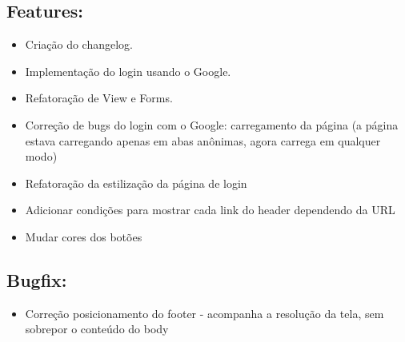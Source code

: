 \documentclass[
40pt,				%
openright,			%
oneside,			%
a4paper,			%
chapter=TITLE,		%
sumario=tradicional,
english,			%
]{abntex2}
\begin{document}
	\subsection*{\textbf{Features:}} %
	\begin{itemize} \setlength\itemsep{0em}
		
		\item Criação do changelog.
		\item Implementação do login usando o Google.
		\item Refatoração de View e Forms.
		\item Correção de bugs do login com o Google: carregamento da página (a página estava carregando apenas em abas anônimas, agora carrega em qualquer modo)
		\item Refatoração da estilização da página de login
		\item Adicionar condições para mostrar cada link do header dependendo da URL
		\item Mudar cores dos botões

	\end{itemize}

	\subsection*{\textbf{Bugfix:}} %
	\begin{itemize} \setlength\itemsep{0em}

		\item Correção posicionamento do footer - acompanha a resolução da tela, sem sobrepor o conteúdo do body

	\end{itemize}

	
	
	\postextual
	
	
\end{document}
